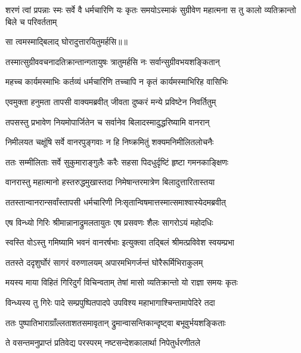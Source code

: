 \threelineshloka
{शरणं त्वां प्रपन्नाः स्मः सर्वे वै धर्मचारिणि}
{यः कृतः समयोऽस्माकं सुग्रीवेण महात्मना}
{स तु कालो व्यतिक्रान्तो बिले च परिवर्तताम्} %

{सा त्वमस्माद्बिलाद् घोरादुत्तारयितुमर्हसि॥॥} %

\addtocounter{shlokacount}{1}

\twolineshloka
{तस्मात्सुग्रीववचनादतिक्रान्तान्गतायुषः}
{त्रातुमर्हसि नः सर्वान्सुग्रीवभयशङ्कितान्} %

\twolineshloka
{महच्च कार्यमस्माभिः कर्तव्यं धर्मचारिणि}
{तच्चापि न कृतं कार्यमस्माभिरिह वासिभिः} %

\twolineshloka
{एवमुक्ता हनुमता तापसी वाक्यमब्रवीत्}
{जीवता दुष्करं मन्ये प्रविष्टेन निवर्तितुम्} %

\twolineshloka
{तपसस्तु प्रभावेण नियमोपार्जितेन च}
{सर्वानेव बिलादस्मादुद्धरिष्यामि वानरान्} %

\twolineshloka
{निमीलयत चक्षूंषि सर्वे वानरपुङ्गवाः}
{न हि निष्क्रमितुं शक्यमनिमीलितलोचनैः} %

\twolineshloka
{ततः सम्मीलिताः सर्वे सुकुमाराङ्गुलैः करैः}
{सहसा पिदधुर्दृष्टिं हृष्टा गमनकाङ्क्षिणः} %

\twolineshloka
{वानरास्तु महात्मानो हस्तरुद्धमुखास्तदा}
{निमेषान्तरमात्रेण बिलादुत्तारितास्तया} %

\twolineshloka
{ततस्तान्वानरान्सर्वांस्तापसी धर्मचारिणी}
{निःसृतान्विषमात्तस्मात्समाश्वास्येदमब्रवीत्} %

\twolineshloka
{एष विन्ध्यो गिरिः श्रीमान्नानाद्रुमलतायुतः}
{एष प्रसवणः शैलः सागरोऽयं महोदधिः} %

\twolineshloka
{स्वस्ति वोऽस्तु गमिष्यामि भवनं वानरर्षभाः}
{इत्युक्त्वा तद्बिलं श्रीमत्प्रविवेश स्वयम्प्रभा} %

\twolineshloka
{ततस्ते ददृशुर्घोरं सागरं वरुणालयम्}
{अपारमभिगर्जन्तं घोरैरूर्मिभिराकुलम्} %

\twolineshloka
{मयस्य माया विहितं गिरिदुर्गं विचिन्वताम्}
{तेषां मासो व्यतिक्रान्तो यो राज्ञा समयः कृतः} %

\twolineshloka
{विन्ध्यस्य तु गिरेः पादे सम्प्रपुष्पितपादपे}
{उपविश्य महाभागाश्चिन्तामापेदिरे तदा} %

\twolineshloka
{ततः पुष्पातिभाराग्राँल्लताशतसमावृतान्}
{द्रुमान्वासन्तिकान्दृष्ट्वा बभूवुर्भयशङ्किताः} %

\twolineshloka
{ते वसन्तमनुप्राप्तं प्रतिवेद्य परस्परम्}
{नष्टसन्देशकालार्था निपेतुर्धरणीतले} %

